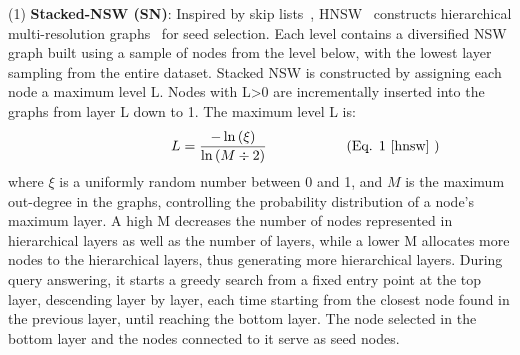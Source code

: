 \noindent (1) \textbf{Stacked-NSW (SN)}: Inspired by skip lists~\cite{skiplist}, HNSW~\cite{hnsw} constructs hierarchical multi-resolution graphs~\cite{nsw14} for seed selection. Each level contains a diversified NSW graph built using a sample of nodes from the level below, with the lowest layer sampling from the entire dataset. Stacked NSW is constructed by assigning each node a maximum level L. Nodes with L>0 are incrementally inserted into the graphs from layer L down to 1. 
The maximum level L is: %
\begin{equation}
\hspace{3cm}
L = \frac{-\ln \left(\xi\right)}{\ln\left(M\div2\right)} 
 \hspace{2cm} (\text{Eq. 1 \cite{hnsw} }) \tag*{}
\end{equation}
where $\xi$ is a uniformly random number between 0 and 1, %
and $M$ is the maximum out-degree in the graphs, controlling the probability distribution of a node's maximum layer. 
A high M decreases the number of nodes represented in hierarchical layers as well as the number of layers, while a lower M allocates more nodes to the hierarchical layers, thus generating more hierarchical layers. 
During query answering, it starts a greedy search from a fixed entry point at the top layer, descending layer by layer, each time starting from the closest node found in the previous layer, until reaching the bottom layer. The node selected in the bottom layer and the nodes connected to it serve as seed nodes.

     

